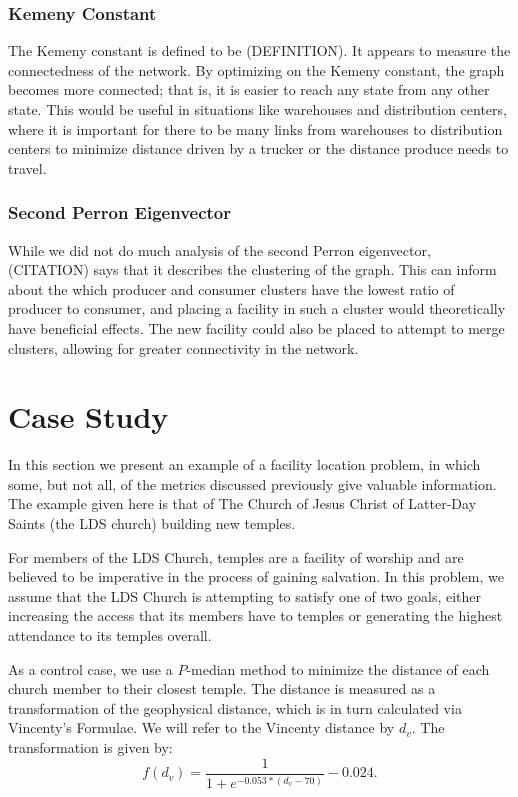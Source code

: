 \documentclass[twoside,twocolumn]{article}
\begin{document}
\subsubsection{Kemeny Constant}
The Kemeny constant is defined to be (DEFINITION).
It appears to measure the connectedness of the network.
By optimizing on the Kemeny constant, the graph becomes more connected; that is, it is easier to reach any state from any other state.
This would be useful in situations like warehouses and distribution centers, where it is important for there to be many links from warehouses to distribution centers to minimize distance driven by a trucker or the distance produce needs to travel.

\subsubsection{Second Perron Eigenvector}
While we did not do much analysis of the second Perron eigenvector, (CITATION) says that it describes the clustering of the graph.
This can inform about the which producer and consumer clusters have the lowest ratio of producer to consumer, and placing a facility in such a cluster would theoretically have beneficial effects.
The new facility could also be placed to attempt to merge clusters, allowing for greater connectivity in the network.

\section{Case Study}

In this section we present an example of a facility location problem, in which some, but not all, of the metrics discussed previously give valuable information. 
The example given here is that of The Church of Jesus Christ of Latter-Day Saints (the LDS church) building new temples.


For members of the LDS Church, temples are a facility of worship and are believed to be imperative in the process of gaining salvation.
In this problem, we assume that the LDS Church is attempting to satisfy one of two goals, either increasing the access that its members have to temples or generating the highest attendance to its temples overall.

As a control case, we use a $P$-median method to minimize the distance of each church member to their closest temple.
The distance is measured as a transformation of the geophysical distance, which is in turn calculated via Vincenty's Formulae. %
We will refer to the Vincenty distance by $d_{v}$. %
The transformation is given by:
\begin{equation}
f(d_{v}) = \frac{1}{1+e^{-0.053*(d_{v} - 70)}} - 0.024.
\end{equation}
\end{document}
